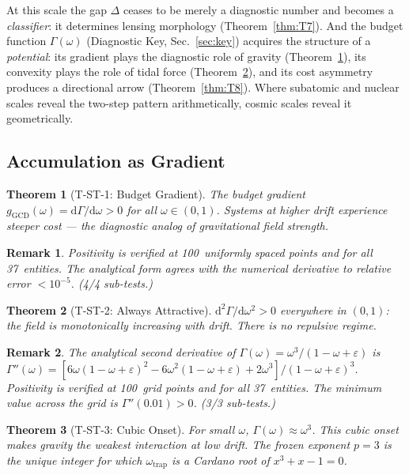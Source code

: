 \documentclass[
  aps,
  prd,
  twocolumn,
  superscriptaddress,
  nofootinbib,
  floatfix
]{revtex4-2}
\newtheorem{theorem}{Theorem}
\newtheorem{remark}{Remark}
\newcommand{\Gam}{\Gamma}
\newcommand{\eps}{\varepsilon}
\newcommand{\dd}{\mathrm{d}}
\begin{document}
At this scale the gap $\Delta$ ceases to be merely a
diagnostic number and becomes a \emph{classifier}: it
determines lensing morphology (Theorem~\ref{thm:T7}).  And
the budget function $\Gam(\omega)$ (Diagnostic Key,
Sec.~\ref{sec:key}) acquires the structure of a
\emph{potential}: its gradient plays the diagnostic role of
gravity (Theorem~\ref{thm:T1}), its convexity plays the
role of tidal force (Theorem~\ref{thm:T2}), and its cost
asymmetry produces a directional arrow
(Theorem~\ref{thm:T8}).  Where subatomic and nuclear scales
reveal the two-step pattern arithmetically, cosmic scales
reveal it geometrically.

\subsection{Accumulation as Gradient}

\begin{theorem}[T-ST-1: Budget Gradient]\label{thm:T1}
The budget gradient
$g_{\mathrm{GCD}}(\omega) = \dd\Gam/\dd\omega > 0$
for all $\omega \in (0,1)$.  Systems at higher drift
experience steeper cost --- the diagnostic analog of
gravitational field strength.
\end{theorem}

\begin{remark}
Positivity is verified at 100~uniformly spaced points and
for all 37~entities.  The analytical form agrees with the
numerical derivative to relative error $< 10^{-5}$.
(4/4 sub-tests.)
\end{remark}

\begin{theorem}[T-ST-2: Always Attractive]\label{thm:T2}
$\dd^2\Gam/\dd\omega^2 > 0$ everywhere in $(0,1)$: the field
is monotonically increasing with drift.  There is no
repulsive regime.
\end{theorem}

\begin{remark}
The analytical second derivative of
$\Gam(\omega) = \omega^3/(1 - \omega + \eps)$ is
$\Gam''(\omega) = [6\omega(1{-}\omega{+}\eps)^2 -
6\omega^2(1{-}\omega{+}\eps) + 2\omega^3] /
(1{-}\omega{+}\eps)^3$.  Positivity is verified at
100~grid points and for all 37~entities.  The minimum
value across the grid is $\Gam''(0.01) > 0$.
(3/3 sub-tests.)
\end{remark}

\begin{theorem}[T-ST-3: Cubic Onset]\label{thm:T3}
For small $\omega$, $\Gam(\omega) \approx \omega^3$.  This
cubic onset makes gravity the weakest interaction at low drift.
The frozen exponent $p = 3$ is the unique integer for which
$\omega_{\mathrm{trap}}$ is a Cardano root of
$x^3 + x - 1 = 0$.
\end{theorem}
\end{document}
